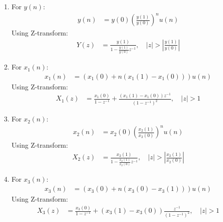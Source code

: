 \documentclass[journal,12pt,twocolumn]{IEEEtran}
\theoremstyle{remark}
\begin{document}
\begin{enumerate}

\item For $y(n)$:
    \begin{align}
        y(n) &= y(0)\left(\frac{y(1)}{y(0)}\right)^n u(n)
    \end{align}
     Using Z-transform:
    \begin{align}
        Y(z) &= \frac{y(1)}{1-\frac{y(1)}{y(0)}z^{-1}}, \quad \left|z\right|>\left|\frac{y(1)}{y(0)}\right|
    \end{align}
    
    \item For $x_1(n)$:
    \begin{align}
        x_1(n) &= (x_1(0) + n(x_1(1)-x_1(0)))u(n)
    \end{align}
    Using Z-transform:
    \begin{align}
        X_1(z) &= \frac{x_1(0)}{1-z^{-1}} + \frac{(x_1(1)-x_1(0))z^{-1}}{(1-z^{-1})^2} , \quad |z| > 1
    \end{align}

    \item For $x_2(n)$:
    \begin{align}
        x_2(n) &= x_2(0)\left(\frac{x_2(1)}{x_2(0)}\right)^n u(n)
    \end{align}
     Using Z-transform:
    \begin{align}
        X_2(z) &= \frac{x_2(1)}{1-\frac{x_2(1)}{x_2(0)}z^{-1}},  \quad \left|z\right|>\left|\frac{x_2(1)}{x_2(0)}\right|
    \end{align}

    \item For $x_3(n)$:
    \begin{align}
        x_3(n) &= \left(x_3(0) + n\left(x_3(0) - x_3(1)\right)\right)u(n)
    \end{align}
   Using Z-transform:
    \begin{align}
        X_3(z) &= \frac{x_3(0)}{1-z^{-1}} + \left(x_3(1) - x_3(0)\right)\frac{z^{-1}}{(1-z^{-1})^2} , \quad |z| > 1
    \end{align}
\end{enumerate}
\end{document}
